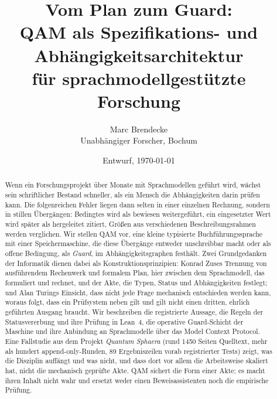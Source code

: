 \documentclass[11pt]{article}
\title{Vom Plan zum Guard:\\
\large QAM als Spezifikations- und Abhängigkeitsarchitektur\\ für sprachmodellgestützte Forschung}
\author{Marc Brendecke\\ \small Unabhängiger Forscher, Bochum}
\date{Entwurf, \today}
\theoremstyle{definition}
\theoremstyle{remark}
\begin{document}
\maketitle

\begin{abstract}
Wenn ein Forschungsprojekt über Monate mit Sprachmodellen geführt wird, wächst sein schriftlicher Bestand schneller, als ein Mensch
die Abhängigkeiten darin prüfen kann. Die folgenreichen Fehler liegen dann selten in einer einzelnen Rechnung, sondern in stillen
Übergängen: Bedingtes wird als bewiesen weitergeführt, ein eingesetzter Wert wird später als hergeleitet zitiert, Größen aus
verschiedenen Beschreibungsrahmen werden verglichen. Wir stellen QAM vor, eine kleine typisierte Buchführungssprache mit einer
Speichermaschine, die diese Übergänge entweder unschreibbar macht oder als offene Bedingung, als \emph{Guard}, im
Abhängigkeitsgraphen festhält. Zwei Grundgedanken der Informatik dienen dabei als Konstruktionsprinzipien: Konrad Zuses Trennung
von ausführendem Rechenwerk und formalem Plan, hier zwischen dem Sprachmodell, das formuliert und rechnet, und der Akte, die Typen,
Status und Abhängigkeiten festlegt; und Alan Turings Einsicht, dass nicht jede Frage mechanisch entschieden werden kann, woraus folgt,
dass ein Prüfsystem neben \glqq gilt\grqq{} und \glqq gilt nicht\grqq{} einen dritten, ehrlich geführten Ausgang braucht. Wir
beschreiben die registrierte Aussage, die Regeln der Statusvererbung und ihre Prüfung in Lean~4, die operative Guard-Schicht der
Maschine und ihre Anbindung an Sprachmodelle über das Model Context Protocol. Eine Fallstudie aus dem Projekt \emph{Quantum Sphaera}
(rund 1450 Seiten Quelltext, mehr als hundert append-only-Runden, 89 Ergebniszeilen vorab registrierter Tests) zeigt, was die
Disziplin auffängt und was nicht, und dass dort vor allem die Arbeitsweise skaliert hat, nicht die mechanisch geprüfte Akte. QAM sichert die Form einer Akte; es macht ihren Inhalt nicht wahr und ersetzt weder einen
Beweisassistenten noch die empirische Prüfung.
\end{abstract}




{\sloppy}





\appendix

\end{document}
